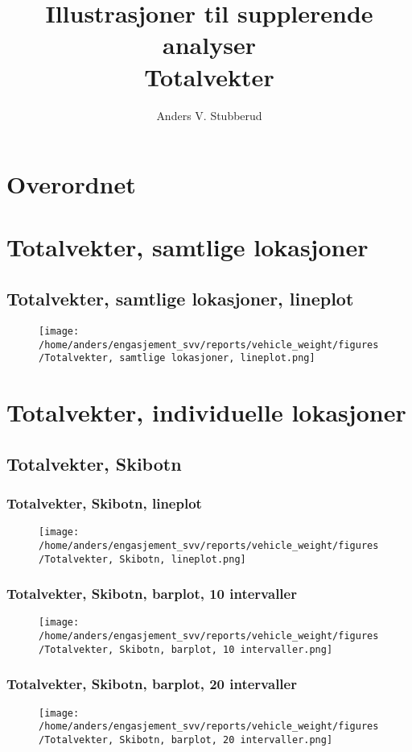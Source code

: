 \documentclass{article}
\begin{document}
\title{Illustrasjoner til supplerende analyser\\Totalvekter}
\author{Anders V. Stubberud}
\maketitle
\tableofcontents
\newpage
\section{Overordnet}

\section{Totalvekter, samtlige lokasjoner}
\subsection{Totalvekter, samtlige lokasjoner, lineplot}
\begin{figure}[H]
\centering
\texttt{[image: /home/anders/engasjement\_svv/reports/vehicle\_weight/figures/Totalvekter, samtlige lokasjoner, lineplot.png]}
\end{figure}
\section{Totalvekter, individuelle lokasjoner}
\subsection{Totalvekter, Skibotn}
\subsubsection{Totalvekter, Skibotn, lineplot}
\begin{figure}[H]
\centering
\texttt{[image: /home/anders/engasjement\_svv/reports/vehicle\_weight/figures/Totalvekter, Skibotn, lineplot.png]}
\end{figure}
\subsubsection{Totalvekter, Skibotn, barplot, 10 intervaller}
\begin{figure}[H]
\centering
\texttt{[image: /home/anders/engasjement\_svv/reports/vehicle\_weight/figures/Totalvekter, Skibotn, barplot, 10 intervaller.png]}
\end{figure}
\subsubsection{Totalvekter, Skibotn, barplot, 20 intervaller}
\begin{figure}[H]
\centering
\texttt{[image: /home/anders/engasjement\_svv/reports/vehicle\_weight/figures/Totalvekter, Skibotn, barplot, 20 intervaller.png]}
\end{figure}
\end{document}
